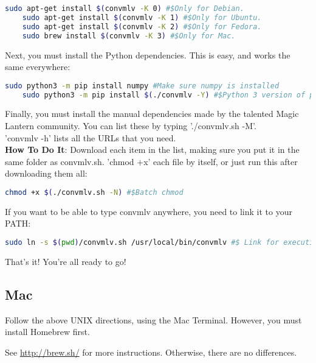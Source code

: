\documentclass[a4paper,12pt]{article}
\begin{document}
\begin{lstlisting}[language=bash]
	sudo apt-get install $(convmlv -K 0) #$Only for Debian.
	sudo apt-get install $(convmlv -K 1) #$Only for Ubuntu.
	sudo apt-get install $(convmlv -K 2) #$Only for Fedora.
	sudo brew install $(convmlv -K 3) #$Only for Mac.
\end{lstlisting}

		Next, you must install the Python dependencies. This is easy, and works the same everywhere:
		
\begin{lstlisting}[language=bash]
	sudo python3 -m pip install numpy #Make sure numpy is installed
	sudo python3 -m pip install $(./convmlv -Y) #$Python 3 version of pip.
\end{lstlisting}

		Finally, you must install the manual dependencies made by the talented Magic Lantern community. You can list these
		by typing './convmlv.sh -M'.\\
		
		'convmlv -h' lists all the URLs that you need.\\
		
		\textbf{How To Do It}: Download each item in the list, making sure you put it in the same folder as convmlv.sh. 'chmod +x' each
		file by itself, or just run this after downloading them all:
		
\begin{lstlisting}[language=bash]
	chmod +x $(./convmlv.sh -N) #$Batch chmod
\end{lstlisting}
		
		If you want to be able to type convmlv anywhere, you need to link it to your PATH:
		
\begin{lstlisting}[language=bash]
	sudo ln -s $(pwd)/convmlv.sh /usr/local/bin/convmlv #$ Link for execution.
\end{lstlisting}
		
		That's it! You're all ready to go!
		
	\subsection{Mac}
	
		Follow the above UNIX directions, using the Mac Terminal. However, you must install Homebrew first.
		
		See \url{http://brew.sh/} for more instructions. Otherwise, there are no differences.
\end{document}
